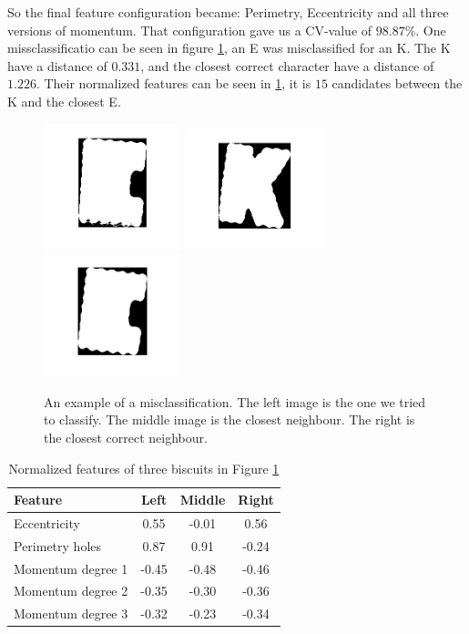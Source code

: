 \documentclass[a4paper,11pt]{article}
\begin{document}
So the final feature configuration became: Perimetry, Eccentricity and all three versions of momentum.
That configuration gave us a CV-value of $98.87\%$.
One missclassificatio can be seen in figure \ref{fig:misclas},
an E was misclassified for an K. The K have a distance of $0.331$,
and the closest correct character have a distance of $1.226$.
Their normalized features can be seen in \ref{tab:misclas},
it is $15$ candidates between the K and the closest E.

\begin{figure}[]
\begin{center}
\includegraphics[width=40mm]{original.png}
\includegraphics[width=40mm]{closest.png}
\includegraphics[width=40mm]{closest_correct.png}
\end{center}
\caption{An example of a misclassification. 
         The left image is the one we tried to classify. 
         The middle image is the closest neighbour.
         The right is the closest correct neighbour.}
\label{fig:misclas}
\end{figure}

\begin{table}[h!b!p!]
\caption{Normalized features of three biscuits in Figure \ref{fig:misclas}}
\begin{center}
    \begin{tabular}{  l | c | c | c | }
     Feature           & Left  & Middle & Right \\ \hline
     Eccentricity      &  0.55 & -0.01  &  0.56 \\ \hline
     Perimetry holes   &  0.87 &  0.91  & -0.24 \\ \hline
     Momentum degree 1 & -0.45 & -0.48  & -0.46 \\ \hline
     Momentum degree 2 & -0.35 & -0.30  & -0.36 \\ \hline
     Momentum degree 3 & -0.32 & -0.23  & -0.34 \\ \hline
    \end{tabular}
\end{center}
\label{tab:misclas}
\end{table}
\end{document}
